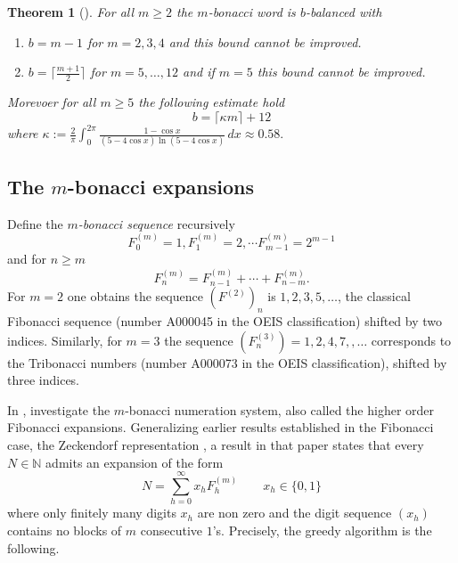 \documentclass{amsart}
\newtheorem{theorem}{Theorem}[section]
\newcommand{\NN}{\mathbb N}
\begin{document}
\begin{theorem}[\cite{bal,balancetrib,generalbalance}]\label{thm3}
For all $m\geq 2$ the $m$-bonacci word is $b$-balanced with 
\begin{enumerate}
\item $b=m-1$ for $m=2,3,4$ and this bound cannot be improved.
\item $b=\lceil \frac{m+1}{2}\rceil$ for $m=5,\dots,12$ and if $m=5$ this bound cannot be improved.
\end{enumerate}
Morevoer for all $m\geq 5$ the following estimate hold
$$b=\lceil \kappa m\rceil+12$$ 
where $\kappa:= \frac{2}{\pi} \int_{0}^{2\pi}
\frac{1-\cos x}{(5-4\cos x)\ln(5-4\cos x)} \, dx \approx 0.58.$
\end{theorem}


\subsection{The $m$-bonacci expansions}
Define the \emph{$m$-bonacci sequence} recursively
$$F^{(m)}_0=1, F^{(m)}_1=2, \cdots F^{(m)}_{m-1}=2^{m-1}$$
and for $n\geq m$
$$F^{(m)}_n=F^{(m)}_{n-1}+\cdots +F^{(m)}_{n-m}.$$
For $m=2$ one obtains the sequence $(F^{(2)})_n$ is $ 1,2,3,5,\dots$, the classical Fibonacci sequence (number A000045  in the OEIS classification) shifted by two indices. 
Similarly,  for $m=3$ the sequence $(F^{(3)}_n)= 1, 2, 4, 7,,\dots$ corresponds to the Tribonacci numbers (number A000073 in the OEIS classification), shifted by three indices.

In \cite{CSH72}, investigate the $m$-bonacci numeration system, also called the higher order Fibonacci expansions. Generalizing earlier results established in the Fibonacci case, the Zeckendorf representation \cite{Lek,zec}, a result in that paper states that every $N\in\NN$ admits an expansion of the form 
\begin{equation}\label{Nfib}N=\sum_{h=0}^{\infty}x_h F^{(m)}_h\qquad x_h\in\{0,1\}\end{equation}
where only finitely many digits $x_h$ are non zero and the digit sequence $(x_h)$ contains no blocks of $m$ consecutive $1$'s. Precisely, the greedy algorithm is the following.
\end{document}
